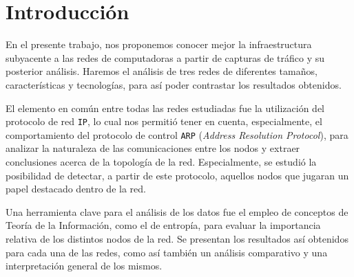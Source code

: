 
\section{Introducción}

En el presente trabajo, nos proponemos conocer mejor la infraestructura
subyacente a las redes de computadoras a partir de capturas de tráfico y su
posterior análisis. Haremos el análisis de tres redes de diferentes tamaños,
características y tecnologías, para así poder contrastar los resultados
obtenidos.

El elemento en común entre todas las redes estudiadas fue la utilización del
protocolo de red \texttt{IP}, lo cual nos permitió tener en cuenta,
especialmente, el comportamiento del protocolo de control \texttt{ARP}
(\textit{Address Resolution Protocol}), para analizar la naturaleza de las
comunicaciones entre los nodos y extraer conclusiones acerca de la topología
de la red. Especialmente, se estudió la posibilidad de detectar, a partir de
este protocolo, aquellos nodos que jugaran un papel destacado dentro de la
red.

Una herramienta clave para el análisis de los datos fue el empleo de conceptos
de Teoría de la Información, como el de entropía, para evaluar la importancia
relativa de los distintos nodos de la red. Se presentan los resultados así
obtenidos para cada una de las redes, como así también un análisis comparativo
y una interpretación general de los mismos.
